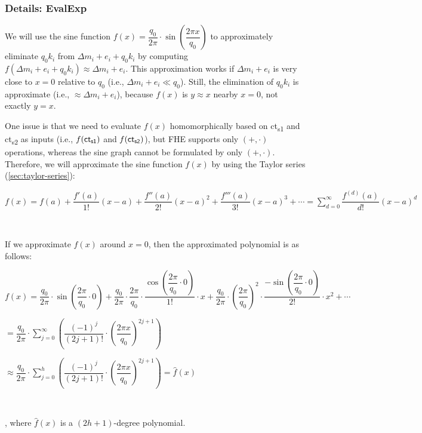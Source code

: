 \subsubsection{Details: \textsf{EvalExp}}
\label{subsubsec:ckks-bootstrapping-evalexp-details}

We will use the sine function $f(x) = \dfrac{q_0}{2\pi}\cdot \sin\left(\dfrac{2\pi x}{q_0}\right)$ to approximately eliminate $q_0k_i$ from $\Delta m_i + e_i + q_0k_i$ by computing $f(\Delta m_i + e_i + q_0k_i) \approx \Delta m_i + e_i$. This approximation works if $\Delta m_i + e_i$ is very close to $x=0$ relative to $q_0$ (i.e., $\Delta m_i + e_i \ll q_0$). Still, the elimination of $q_0k_i$ is approximate (i.e., $\approx \Delta m_i + e_i$), because $f(x)$ is $y \approx x$ nearby $x=0$, not exactly $y = x$.

One issue is that we need to evaluate $f(x)$ homomorphically based on \textsf{ct\textsubscript{s1}} and \textsf{ct\textsubscript{s2}} as inputs (i.e., $f(\textsf{ct\textsubscript{s1}})$ and $f(\textsf{ct\textsubscript{s2}})$), but FHE supports only $(+, \cdot)$ operations, whereas the sine graph cannot be formulated by only $(+, \cdot)$. Therefore, we will approximate the sine function $f(x)$ by using the Taylor series (\autoref{sec:taylor-series}):

$f(x) = f(a) + \dfrac{f'(a)}{1!}(x-a) + \dfrac{f''(a)}{2!}(x-a)^2 + \dfrac{f'''(a)}{3!}(x-a)^3 + \cdots = \sum\limits_{d=0}^{\infty}\dfrac{f^{(d)}(a)}{d!}(x-a)^d$

$ $

If we approximate $f(x)$ around $x = 0$, then the approximated polynomial is as follows:

$f(x) = \dfrac{q_0}{2\pi}\cdot \sin\left(\dfrac{2\pi}{q_0}\cdot 0\right) + \dfrac{q_0}{2\pi}\cdot\dfrac{2\pi}{q_0}\cdot\dfrac{\cos\left(\dfrac{2\pi}{q_0} \cdot 0\right)}{1!}\cdot x + \dfrac{q_0}{2\pi}\cdot \left(\dfrac{2\pi}{q_0}\right)^{2}\cdot\dfrac{-\sin\left(\dfrac{2\pi}{q_0} \cdot 0\right)}{2!}\cdot x^2 + \cdots$

$ = \dfrac{q_0}{2\pi}\cdot \sum\limits_{j=0}^{\infty}\left(\dfrac{(-1)^j}{(2j + 1)!}\cdot \left(\dfrac{2\pi x}{q_0}\right)^{2j + 1}\right)$

$ \approx \dfrac{q_0}{2\pi}\cdot \sum\limits_{j=0}^{h}\left(\dfrac{(-1)^j}{(2j + 1)!}\cdot \left(\dfrac{2\pi x}{q_0}\right)^{2j + 1}\right) = \hat f(x)$

$ $

, where $\hat{f}(x)$ is a $(2h + 1)$-degree polynomial.

